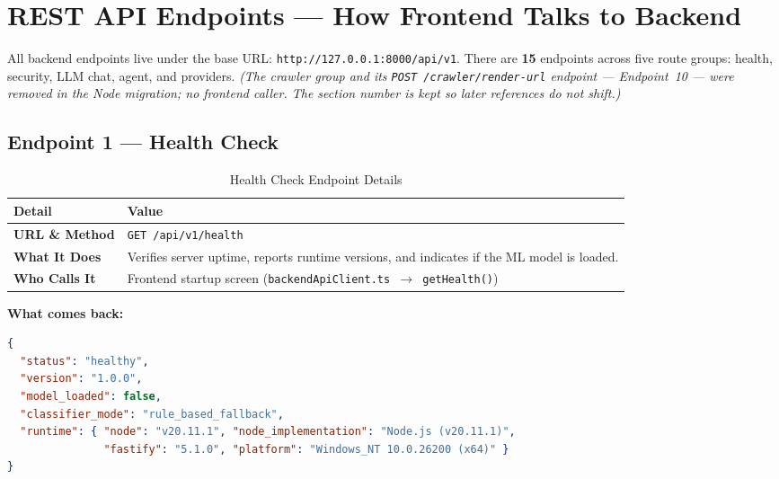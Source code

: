 \documentclass[11pt,a4paper]{article}
\begin{document}
\section{REST API Endpoints --- How Frontend Talks to Backend}

All backend endpoints live under the base URL: \texttt{http://127.0.0.1:8000/api/v1}. There are \textbf{15} endpoints across five route groups: health, security, LLM chat, agent, and providers. \emph{(The crawler group and its \texttt{POST /crawler/render-url} endpoint --- Endpoint~10 --- were removed in the Node migration; no frontend caller. The section number is kept so later references do not shift.)}

\subsection{Endpoint 1 --- Health Check}
\begin{table}[H]
\centering
\small
\begin{tabularx}{\textwidth}{BX}
\toprule
\textbf{Detail} & \textbf{Value} \\
\midrule
\textbf{URL \& Method} & \texttt{GET /api/v1/health} \\
\textbf{What It Does} & Verifies server uptime, reports runtime versions, and indicates if the ML model is loaded. \\
\textbf{Who Calls It} & Frontend startup screen (\texttt{backendApiClient.ts $\rightarrow$ getHealth()}) \\
\bottomrule
\end{tabularx}
\caption{Health Check Endpoint Details}
\end{table}

\textbf{What comes back:}
\begin{lstlisting}[language=json]
{
  "status": "healthy",
  "version": "1.0.0",
  "model_loaded": false,
  "classifier_mode": "rule_based_fallback",
  "runtime": { "node": "v20.11.1", "node_implementation": "Node.js (v20.11.1)",
               "fastify": "5.1.0", "platform": "Windows_NT 10.0.26200 (x64)" }
}
\end{lstlisting}
\end{document}
